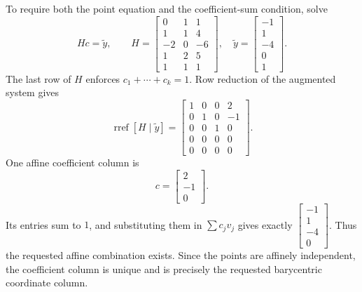 To require both the point equation and the coefficient-sum condition, solve
\[Hc=\widetilde y,\qquad H=\begin{bmatrix}0&1&1\\1&1&4\\-2&0&-6\\1&2&5\\1&1&1\end{bmatrix},\quad\widetilde y=\begin{bmatrix}-1\\1\\-4\\0\\1\end{bmatrix}.\]
The last row of $H$ enforces $c_1+\cdots+c_k=1$. Row reduction of the augmented system gives
\[\operatorname{rref}[H\mid\widetilde y]=\begin{bmatrix}1&0&0&2\\0&1&0&-1\\0&0&1&0\\0&0&0&0\\0&0&0&0\end{bmatrix}.\]
One affine coefficient column is
\[c=\begin{bmatrix}2\\-1\\0\end{bmatrix}.\]
Its entries sum to $1$, and substituting them in $\sum c_jv_j$ gives exactly $\begin{bmatrix}-1\\1\\-4\\0\end{bmatrix}$. Thus the requested affine combination exists. Since the points are affinely independent, the coefficient column is unique and is precisely the requested barycentric coordinate column.

